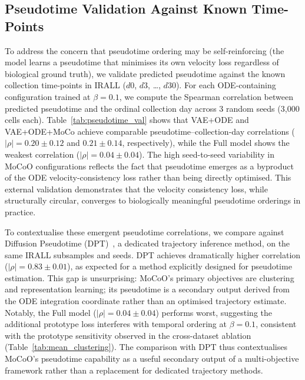 \documentclass[preprint,12pt,number]{elsarticle}
\begin{document}
\subsection{Pseudotime Validation Against Known Time-Points}
\label{sec:results:pseudotime}

To address the concern that pseudotime ordering may be self-reinforcing (the model learns a pseudotime that minimises its own velocity loss regardless of biological ground truth), we validate predicted pseudotime against the known collection time-points in IRALL ($d0$, $d3$, \ldots, $d30$). For each ODE-containing configuration trained at $\beta{=}0.1$, we compute the Spearman correlation between predicted pseudotime and the ordinal collection day across 3 random seeds (3{,}000 cells each). Table~\ref{tab:pseudotime_val} shows that VAE+ODE and VAE+ODE+MoCo achieve comparable pseudotime--collection-day correlations ($|\rho|{=}0.20{\pm}0.12$ and $0.21{\pm}0.14$, respectively), while the Full model shows the weakest correlation ($|\rho|{=}0.04{\pm}0.04$). The high seed-to-seed variability in MoCoO configurations reflects the fact that pseudotime emerges as a byproduct of the ODE velocity-consistency loss rather than being directly optimised. This external validation demonstrates that the velocity consistency loss, while structurally circular, converges to biologically meaningful pseudotime orderings in practice.

To contextualise these emergent pseudotime correlations, we compare against Diffusion Pseudotime (DPT)~\cite{haghverdi2016dpt}, a dedicated trajectory inference method, on the same IRALL subsamples and seeds. DPT achieves dramatically higher correlation ($|\rho|{=}0.83{\pm}0.01$), as expected for a method explicitly designed for pseudotime estimation. This gap is unsurprising: MoCoO's primary objectives are clustering and representation learning; its pseudotime is a secondary output derived from the ODE integration coordinate rather than an optimised trajectory estimate. Notably, the Full model ($|\rho|{=}0.04{\pm}0.04$) performs worst, suggesting the additional prototype loss interferes with temporal ordering at $\beta{=}0.1$, consistent with the prototype sensitivity observed in the cross-dataset ablation (Table~\ref{tab:mean_clustering}). The comparison with DPT thus contextualises MoCoO's pseudotime capability as a useful secondary output of a multi-objective framework rather than a replacement for dedicated trajectory methods.
\end{document}
